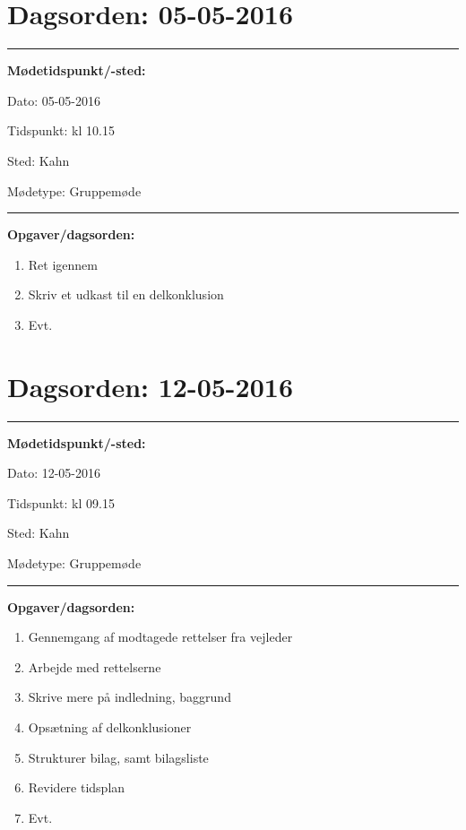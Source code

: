 \newpage 
\section{Dagsorden: 05-05-2016 }
\hrule
\textbf{Mødetidspunkt/-sted:} 

Dato: \tabto{7em} 05-05-2016

Tidspunkt: \tabto{7em} kl 10.15

Sted: \tabto{7em} Kahn 

Mødetype: \tabto{7em} Gruppemøde \newline


\hrule
\textbf{Opgaver/dagsorden:} \newline
\begin{enumerate}
	\item Ret igennem
	\item Skriv et udkast til en delkonklusion
	\item Evt. 
\end{enumerate}

\newpage 
\section{Dagsorden: 12-05-2016 }
\hrule
\textbf{Mødetidspunkt/-sted:} 

Dato: \tabto{7em} 12-05-2016

Tidspunkt: \tabto{7em} kl 09.15

Sted: \tabto{7em} Kahn 

Mødetype: \tabto{7em} Gruppemøde \newline


\hrule
\textbf{Opgaver/dagsorden:} \newline
\begin{enumerate}
	\item Gennemgang af modtagede rettelser fra vejleder
	\item Arbejde med rettelserne
	\item Skrive mere på indledning, baggrund
	\item Opsætning af delkonklusioner
	\item Strukturer bilag, samt bilagsliste
	\item Revidere tidsplan
	\item Evt. 
\end{enumerate}
